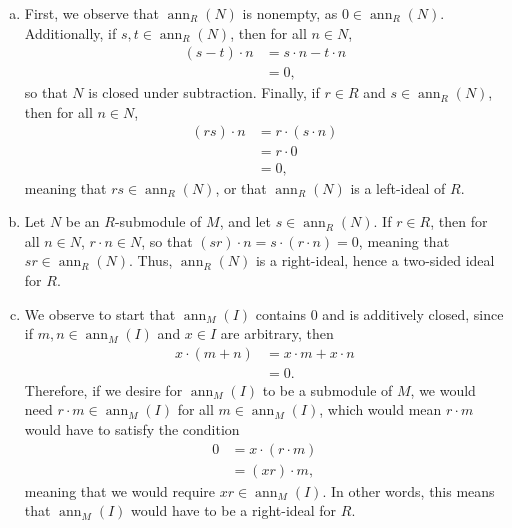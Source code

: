 \documentclass[10pt]{mypackage}
\begin{document}
\begin{solution}\hfill
  \begin{enumerate}[(a)]
    \item First, we observe that $\operatorname{ann}_R(N)$ is nonempty, as $0\in \operatorname{ann}_R(N)$. Additionally, if $s,t\in \operatorname{ann}_R(N)$, then for all $n\in N$,
      \begin{align*}
        \left( s-t \right)\cdot n &= s\cdot n - t\cdot n\\
                                  &= 0,
      \end{align*}
      so that $N$ is closed under subtraction. Finally, if $r\in R$ and $s\in \operatorname{ann}_R\left( N \right)$, then for all $n\in N$,
      \begin{align*}
        \left( rs \right)\cdot n &= r\cdot \left( s\cdot n \right)\\
                                 &= r\cdot 0\\
                                 &= 0,
      \end{align*}
      meaning that $rs\in \operatorname{ann}_R\left( N \right)$, or that $\operatorname{ann}_R\left( N \right)$ is a left-ideal of $R$.
    \item Let $N$ be an $R$-submodule of $M$, and let $s\in \operatorname{ann}_R\left( N \right)$. If $r\in R$, then for all $n\in N$, $r\cdot n\in N$, so that $\left( sr \right)\cdot n = s\cdot \left( r\cdot n \right) = 0$, meaning that $sr\in \operatorname{ann}_R\left( N \right)$. Thus, $\operatorname{ann}_R\left( N \right)$ is a right-ideal, hence a two-sided ideal for $R$.
    \item We observe to start that $\operatorname{ann}_M(I)$ contains $0$ and is additively closed, since if $m,n\in \operatorname{ann}_M\left( I \right)$ and $x\in I$ are arbitrary, then
      \begin{align*}
        x\cdot \left( m + n \right) &= x\cdot m + x\cdot n\\
                                    &= 0.
      \end{align*}
      Therefore, if we desire for $\operatorname{ann}_M(I)$ to be a submodule of $M$, we would need $r\cdot m\in \operatorname{ann}_M(I)$ for all $m\in \operatorname{ann}_M(I)$, which would mean $r\cdot m$ would have to satisfy the condition
      \begin{align*}
        0 &= x\cdot \left( r\cdot m \right)\\
          &= \left( xr \right)\cdot m,
      \end{align*}
      meaning that we would require $xr\in \operatorname{ann}_M(I)$. In other words, this means that $\operatorname{ann}_M(I)$ would have to be a right-ideal for $R$.
  \end{enumerate}
\end{solution}
\end{document}

